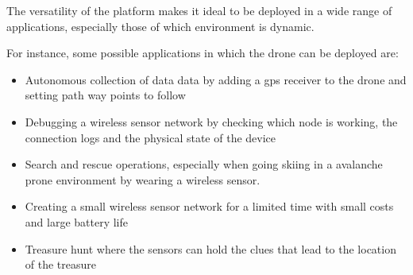 \label{chap:future}

The versatility of the platform makes it ideal to be deployed in a wide range of applications, especially those of which environment is dynamic.

For instance, some possible applications in which the drone can be deployed are:

 \begin{itemize} 

\item  Autonomous collection of data data by adding a gps receiver to the drone and setting path way points to follow\cite{fcint}

\item Debugging a wireless sensor network by checking which node is working, the connection logs and the physical state of the device

\item Search and rescue operations, especially when going skiing in a avalanche prone environment by wearing a wireless sensor. 

\item Creating a small wireless sensor network for a limited time with small costs and large battery life

\item Treasure hunt where the sensors can hold the clues that lead to the location of the treasure

 
\end{itemize}

